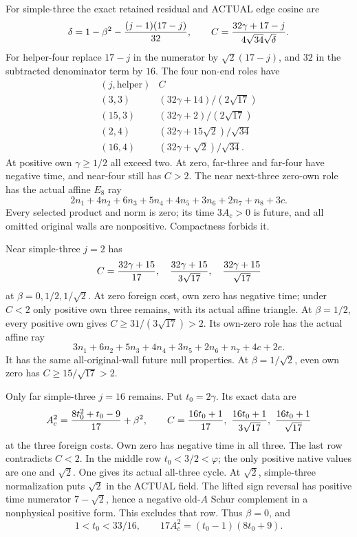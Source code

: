 For simple-three the exact retained residual
and ACTUAL edge cosine are
\[
 \delta=1-\beta^2-{(j-1)(17-j)\over32},\qquad
 C={32\gamma+17-j\over4\sqrt{34}\sqrt\delta}.
\]
For helper-four replace \(17-j\) in
the numerator by \(\sqrt2(17-j)\), and
\(32\) in the subtracted denominator term
by \(16\).
The four non-end roles have
\[
 \begin{array}{c|c}
 (j,\text{helper})&C\\ \hline
 (3,3)&(32\gamma+14)/(2\sqrt{17})\\
 (15,3)&(32\gamma+2)/(2\sqrt{17})\\
 (2,4)&(32\gamma+15\sqrt2)/\sqrt{34}\\
 (16,4)&(32\gamma+\sqrt2)/\sqrt{34}.
 \end{array}
\]
At positive own \(\gamma\ge1/2\) all
exceed two.
At zero, far-three and far-four have
negative time, and near-four still
has \(C>2\).
The near next-three zero-own role has
the actual affine \(E_8\) ray
\[
              2n_1+4n_2+6n_3+5n_4+4n_5+3n_6+2n_7+n_8+3c .
\]
Every selected product and norm is zero;
its time \(3A_c>0\) is future, and
all omitted original walls are nonpositive.
Compactness forbids it.

Near simple-three \(j=2\) has
\[
 C={32\gamma+15\over17},\quad
   {32\gamma+15\over3\sqrt{17}},\quad
   {32\gamma+15\over\sqrt{17}}
\]
at \(\beta=0,1/2,1/\sqrt2\).
At zero foreign cost, own zero has
negative time; under \(C<2\) only
positive own three remains, with its
actual affine triangle.
At \(\beta=1/2\), every positive own
gives \(C\ge31/(3\sqrt{17})>2\).
Its own-zero role has the actual
affine ray
\[
                 3n_1+6n_2+5n_3+4n_4+3n_5+2n_6+n_7+4c+2e .
\]
It has the same all-original-wall future
null properties.
At \(\beta=1/\sqrt2\), even own zero
has \(C\ge15/\sqrt{17}>2\).

Only far simple-three \(j=16\) remains.
Put \(t_0=2\gamma\).
Its exact data are
\[
 A_c^2={8t_0^2+t_0-9\over17}+\beta^2,\qquad
 C={16t_0+1\over17},\
   {16t_0+1\over3\sqrt{17}},\
   {16t_0+1\over\sqrt{17}}
\]
at the three foreign costs.
Own zero has negative time in all three.
The last row contradicts \(C<2\).
In the middle row \(t_0<3/2<\varphi\);
the only positive native values are one
and \(\sqrt2\).
One gives its actual all-three cycle.
At \(\sqrt2\), simple-three normalization
puts \(\sqrt2\) in the ACTUAL field.
The lifted sign reversal has positive
time numerator \(7-\sqrt2\), hence a
negative old-\(A\) Schur complement in
a nonphysical positive form.
This excludes that row.
Thus \(\beta=0\), and
\[
                    1<t_0<33/16,\qquad
                    17A_c^2=(t_0-1)(8t_0+9).
\]


